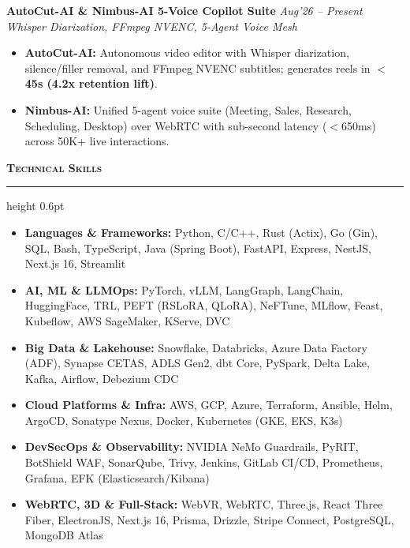 \documentclass[10pt,a4paper]{article}
\newcommand{\resumesection}[1]{%
    \vspace{2.2pt}%
    {\color{burgundy}\scshape\bfseries\fontsize{9.0pt}{10.2pt}\selectfont #1}%
    \vspace{0.6pt}%
    \hrule height 0.6pt\relax%
    \vspace{1.6pt}%
}
\begin{document}
\begin{minipage}[t]{0.488\textwidth}
    \vspace{0.8pt}\vspace{1.2pt}
    \noindent\textbf{AutoCut-AI \& Nimbus-AI 5-Voice Copilot Suite} \hfill {\footnotesize\textit{Aug'26 -- Present}}\\
    \textit{Whisper Diarization, FFmpeg NVENC, 5-Agent Voice Mesh} \href{https://github.com/KishorKumarParoi/autocut-ai}{\faGithub} \href{https://github.com/KishorKumarParoi/nimbus-voice-agents-suite}{\faGithub}
    \begin{itemize}
        \item \textbf{AutoCut-AI:} Autonomous video editor with Whisper diarization, silence/filler removal, and FFmpeg NVENC subtitles; generates reels in \textbf{$<$45s (4.2x retention lift)}.
        \item \textbf{Nimbus-AI:} Unified 5-agent voice suite (Meeting, Sales, Research, Scheduling, Desktop) over WebRTC with sub-second latency ($<$650ms) across 50K+ live interactions.
    \end{itemize}

    \resumesection{Technical Skills}
    \begin{itemize}[leftmargin=7pt]
        \item \textbf{Languages \& Frameworks:} Python, C/C++, Rust (Actix), Go (Gin), SQL, Bash, TypeScript, Java (Spring Boot), FastAPI, Express, NestJS, Next.js 16, Streamlit
        \item \textbf{AI, ML \& LLMOps:} PyTorch, vLLM, LangGraph, LangChain, HuggingFace, TRL, PEFT (RSLoRA, QLoRA), NeFTune, MLflow, Feast, Kubeflow, AWS SageMaker, KServe, DVC
        \item \textbf{Big Data \& Lakehouse:} Snowflake, Databricks, Azure Data Factory (ADF), Synapse CETAS, ADLS Gen2, dbt Core, PySpark, Delta Lake, Kafka, Airflow, Debezium CDC
        \item \textbf{Cloud Platforms \& Infra:} AWS, GCP, Azure, Terraform, Ansible, Helm, ArgoCD, Sonatype Nexus, Docker, Kubernetes (GKE, EKS, K3s)
        \item \textbf{DevSecOps \& Observability:} NVIDIA NeMo Guardrails, PyRIT, BotShield WAF, SonarQube, Trivy, Jenkins, GitLab CI/CD, Prometheus, Grafana, EFK (Elasticsearch/Kibana)
        \item \textbf{WebRTC, 3D \& Full-Stack:} WebVR, WebRTC, Three.js, React Three Fiber, ElectronJS, Next.js 16, Prisma, Drizzle, Stripe Connect, PostgreSQL, MongoDB Atlas
    \end{itemize}

\end{minipage}
\end{document}
